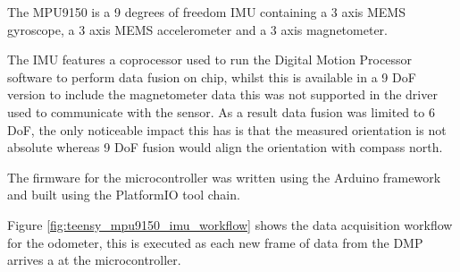 \documentclass{entcs}
\begin{document}
The MPU9150 is a 9 degrees of freedom IMU containing a 3 axis MEMS gyroscope, a
3 axis MEMS accelerometer and a 3 axis magnetometer.

The IMU features a coprocessor used to run the Digital Motion Processor software
to perform data fusion on chip, whilst this is available in a 9 DoF version to
include the magnetometer data this was not supported in the driver used to
communicate with the sensor. As a result data fusion was limited to 6 DoF, the
only noticeable impact this has is that the measured orientation is not
absolute whereas 9 DoF fusion would align the orientation with compass north.

The firmware for the microcontroller was written using the Arduino framework and
built using the PlatformIO tool chain.

Figure \ref{fig:teensy_mpu9150_imu_workflow} shows the data acquisition workflow
for the odometer, this is executed as each new frame of data from the DMP
arrives a at the microcontroller.
\end{document}

